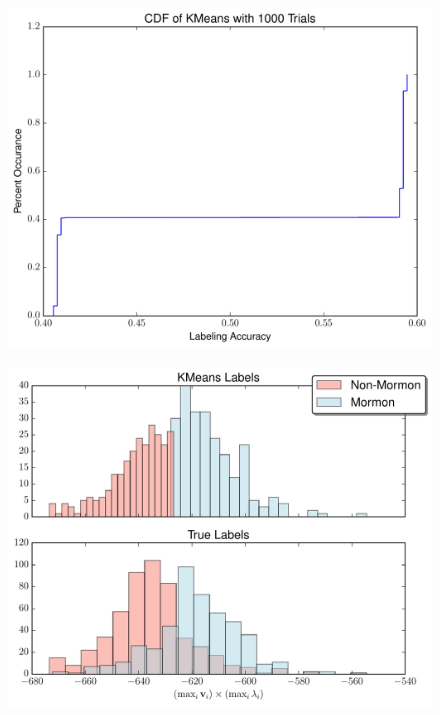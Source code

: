 \documentclass{article}
\begin{document}
\begin{figure}
\centering
\begin{minipage}{.5\textwidth}
  \centering
  \includegraphics[width=.75\linewidth]{data/kmeans_cdf}
  \label{fig:kmeans_cdf}
\end{minipage}%
\begin{minipage}{.5\textwidth}
  \centering
  \includegraphics[width=.75\linewidth]{data/eigennorm.pdf}
  \label{fig:kmeans_label}
\end{minipage}
\end{figure}
\end{document}
